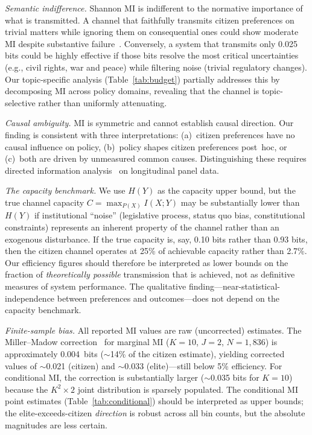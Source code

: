 \documentclass[twocolumn,10pt]{article}
\begin{document}
\emph{Semantic indifference.}  Shannon MI is indifferent to the normative importance of what is transmitted.  A channel that faithfully transmits citizen preferences on trivial matters while ignoring them on consequential ones could show moderate MI despite substantive failure~\citep{cover2006}.  Conversely, a system that transmits only 0.025 bits could be highly effective if those bits resolve the most critical uncertainties (e.g., civil rights, war and peace) while filtering noise (trivial regulatory changes).  Our topic-specific analysis (Table~\ref{tab:budget}) partially addresses this by decomposing MI across policy domains, revealing that the channel is topic-selective rather than uniformly attenuating.

\emph{Causal ambiguity.}  MI is symmetric and cannot establish causal direction.  Our finding is consistent with three interpretations: (a)~citizen preferences have no causal influence on policy, (b)~policy shapes citizen preferences post~hoc, or (c)~both are driven by unmeasured common causes.  Distinguishing these requires directed information analysis~\citep{massey1990} on longitudinal panel data.

\emph{The capacity benchmark.}  We use $H(Y)$ as the capacity upper bound, but the true channel capacity $C = \max_{P(X)} I(X;Y)$ may be substantially lower than $H(Y)$ if institutional ``noise'' (legislative process, status quo bias, constitutional constraints) represents an inherent property of the channel rather than an exogenous disturbance.  If the true capacity is, say, 0.10 bits rather than 0.93 bits, then the citizen channel operates at 25\% of achievable capacity rather than 2.7\%.  Our efficiency figures should therefore be interpreted as lower bounds on the fraction of \emph{theoretically possible} transmission that is achieved, not as definitive measures of system performance.  The qualitative finding---near-statistical-independence between preferences and outcomes---does not depend on the capacity benchmark.

\emph{Finite-sample bias.}  All reported MI values are raw (uncorrected) estimates.  The Miller--Madow correction~\citep{miller1955} for marginal MI ($K{=}10$, $J{=}2$, $N{=}1{,}836$) is approximately 0.004~bits ($\sim$14\% of the citizen estimate), yielding corrected values of $\sim$0.021 (citizen) and $\sim$0.033 (elite)---still below 5\% efficiency.  For conditional MI, the correction is substantially larger ($\sim$0.035 bits for $K{=}10$) because the $K^2 \times 2$ joint distribution is sparsely populated.  The conditional MI point estimates (Table~\ref{tab:conditional}) should be interpreted as upper bounds; the elite-exceeds-citizen \emph{direction} is robust across all bin counts, but the absolute magnitudes are less certain.
\end{document}
